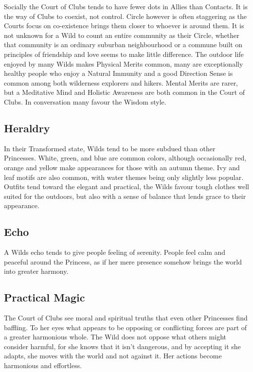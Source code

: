 Socially the Court of Clubs tends to have fewer dots in Allies than Contacts. It is the way of Clubs to coexist, not control. Circle however is often staggering as the Courts focus on co-existence brings them closer to whoever is around them. It is not unknown for a Wild to count an entire community as their Circle, whether that community is an ordinary suburban neighbourhood or a commune built on principles of friendship and love seems to make little difference. The outdoor life enjoyed by many Wilds makes Physical Merits common, many are exceptionally healthy people who enjoy a Natural Immunity and a good Direction Sense is common among both wilderness explorers and hikers. Mental Merits are rarer, but a Meditative Mind and Holistic Awareness are both common in the Court of Clubs. In conversation many favour the Wisdom style.  

\subsection*{Heraldry}

In their Transformed state, Wilds tend to be more subdued than other Princesses. White, green, and blue are common colors, although occasionally red, orange and yellow make appearances for those with an autumn theme. Ivy and leaf motifs are also common, with water themes being only slightly less popular. Outfits tend toward the elegant and practical, the Wilds favour tough clothes well suited for the outdoors, but also with a sense of balance that lends grace to their appearance.

\subsection*{Echo}

A Wilds echo tends to give people feeling of serenity. People feel calm and peaceful around the Princess, as if her mere presence somehow brings the world into greater harmony.

\subsection*{Practical Magic}

The Court of Clubs see moral and spiritual truths that even other Princesses find baffling. To her eyes what appears to be opposing or conflicting forces are part of a greater harmonious whole. The Wild does not oppose what others might consider harmful, for she knows that it isn't dangerous, and by accepting it she adapts, she moves with the world and not against it. Her actions become harmonious and effortless.

